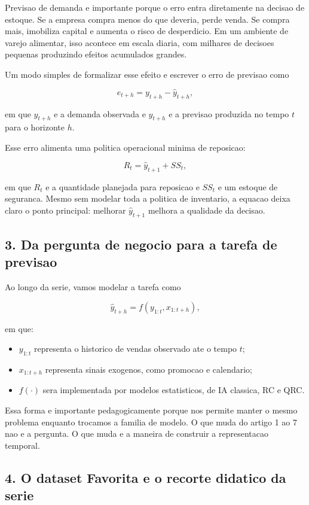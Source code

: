 \documentclass[12pt]{article}
\providecommand{\tightlist}{%
          \setlength{\itemsep}{0pt}\setlength{\parskip}{0pt}}
\begin{document}
Previsao de demanda e importante porque o erro entra diretamente na decisao de estoque. Se a empresa compra menos do que deveria, perde venda. Se compra mais, imobiliza capital e aumenta o risco de desperdicio. Em um ambiente de varejo alimentar, isso acontece em escala diaria, com milhares de decisoes pequenas produzindo efeitos acumulados grandes.

Um modo simples de formalizar esse efeito e escrever o erro de previsao como

\[
e_{t+h} = y_{t+h} - \hat{y}_{t+h},
\]

em que \(y_{t+h}\) e a demanda observada e \(\hat{y}_{t+h}\) e a previsao produzida no tempo \(t\) para o horizonte \(h\).

Esse erro alimenta uma politica operacional minima de reposicao:

\[
R_t = \hat{y}_{t+1} + SS_t,
\]

em que \(R_t\) e a quantidade planejada para reposicao e \(SS_t\) e um estoque de seguranca. Mesmo sem modelar toda a politica de inventario, a equacao deixa claro o ponto principal: melhorar \(\hat{y}_{t+1}\) melhora a qualidade da decisao.

\subsection{3. Da pergunta de negocio para a tarefa de previsao}\label{3-da-pergunta-de-negocio-para-a-tarefa-de-previsao}

Ao longo da serie, vamos modelar a tarefa como

\[
\hat{y}_{t+h} = f(y_{1:t}, x_{1:t+h}),
\]

em que:

\begin{itemize}
\tightlist
\item
  \(y_{1:t}\) representa o historico de vendas observado ate o tempo \(t\);
\item
  \(x_{1:t+h}\) representa sinais exogenos, como promocao e calendario;
\item
  \(f(\cdot)\) sera implementada por modelos estatisticos, de IA classica, RC e QRC.
\end{itemize}

Essa forma e importante pedagogicamente porque nos permite manter o mesmo problema enquanto trocamos a familia de modelo. O que muda do artigo 1 ao 7 nao e a pergunta. O que muda e a maneira de construir a representacao temporal.

\subsection{4. O dataset Favorita e o recorte didatico da serie}\label{4-o-dataset-favorita-e-o-recorte-didatico-da-serie}
\end{document}
